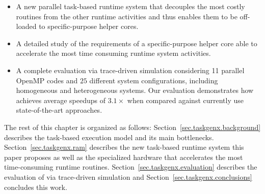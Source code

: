 \begin{itemize}

\item A new parallel task-based runtime system that decouples the most costly routines from the other runtime activities and thus enables them to be off-loaded to specific-purpose helper cores.

\item A detailed study of the requirements of a specific-purpose helper core able to accelerate the most time consuming runtime system activities. 

\item A complete evaluation via trace-driven simulation considering 11 parallel OpenMP codes and $25$ different system configurations, including homogeneous and heterogeneous systems. %
Our evaluation demonstrates how {\proposal} achieves average speedups of $3.1\times$ when compared against currently use state-of-the-art approaches.

\end{itemize} 

The rest of this chapter is organized as follows: 
Section~\ref{sec.taskgenx.background} describes the task-based execution model and its main bottlenecks.
Section~\ref{sec.taskgenx.ram} describes the new task-based runtime system this paper proposes as well as the specialized hardware that accelerates the most time-consuming runtime routines.
Section~\ref{sec.taskgenx.evaluation} describes the evaluation of {\proposal} via trace-driven simulation and Section~\ref{sec.taskgenx.conclusions} concludes this work.

